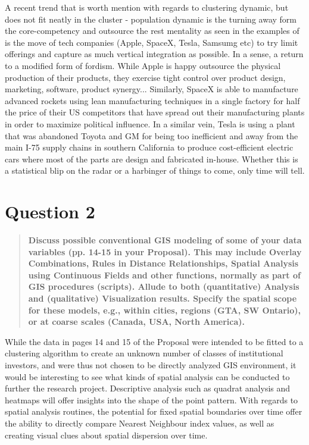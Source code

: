 \documentclass[12pt,letterpaper,notitlepage,onecolumn,final,openbib]{article}
\begin{document}
	A recent trend that is worth mention with regards to clustering dynamic, but does not fit neatly in the cluster - population dynamic is the turning away form the core-competency and outsource the rest mentality as seen in the examples of \cite{Branzanti2015} is the move of tech companies (Apple, SpaceX, Tesla, Samsumg etc) to try limit offerings and capture as much vertical integration as possible.  In a sense, a return to a modified form of fordism.  While Apple is happy outsource the physical production of their products, they exercise tight control over product design, marketing, software, product synergy...  Similarly, SpaceX is able to manufacture advanced rockets using lean manufacturing techniques in a single factory for half the price of their US competitors that have spread out their manufacturing plants in order to maximize political influence.  In a similar vein, Tesla is using a plant that was abandoned Toyota and GM for being too inefficient and away from the main I-75 supply chains in southern California to produce cost-efficient electric cars where most of the parts are design and fabricated in-house.  Whether this is a statistical blip on the radar or a harbinger of things to come, only time will tell.   
	
	
	\section{Question 2}
	\begin{quotation}
		\textbf{Discuss possible conventional GIS modeling of some of your data variables (pp. 14-15 in your Proposal). This may include Overlay Combinations, Rules in Distance Relationships, Spatial Analysis using Continuous Fields and other functions, normally as part of GIS procedures (scripts). Allude to both (quantitative) Analysis and (qualitative) Visualization results. Specify the spatial scope for these models, e.g., within cities, regions (GTA, SW Ontario), or at coarse scales (Canada, USA, North America).}
	\end{quotation}
	
	While the data in pages 14 and 15 of the Proposal were intended to be fitted to a clustering algorithm to create an unknown number of classes of institutional investors, and were thus not chosen to be directly analyzed GIS environment, it would be interesting to see what kinds of spatial analysis can be conducted  to further the research project.  Descriptive analysis such as quadrat analysis and heatmaps will offer insights into the shape of the point pattern.  With regards to spatial analysis routines, the potential for fixed spatial boundaries over time offer the ability to directly compare Nearest Neighbour index values, as well as creating visual clues about spatial dispersion over time.   
	
\end{document}
